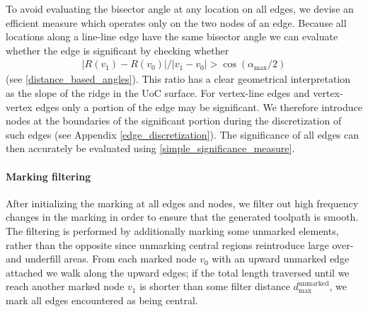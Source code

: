 To avoid evaluating the bisector angle at any location on all edges, we devise an efficient measure which operates only on the two nodes of an edge.
Because all locations along a line-line edge have the same bisector angle we can evaluate whether the edge is significant by checking whether 
\begin{align}\label{simple_significance_measure}
| R(v_1) - R(v_0) | / |v_1 - v_0| >  \cos(\alpha_\text{max} / 2)
\end{align}
(see \cref{distance_based_angles}).
This ratio has a clear geometrical interpretation as the slope of the ridge in the UoC surface.
For vertex-line edges and vertex-vertex edges only a portion of the edge may be significant.
We therefore introduce nodes at the boundaries of the significant portion during the discretization of such edges (see Appendix \ref{edge_discretization}).
The significance of all edges can then accurately be evaluated using \cref{simple_significance_measure}.






\paragraph{Marking filtering}
After initializing the marking at all edges and nodes, we filter out high frequency changes in the marking in order to ensure that the generated toolpath is smooth. 
The filtering is performed by additionally marking some unmarked elements, rather than the opposite since unmarking central regions reintroduce large over- and underfill areas.
From each marked node $v_0$ with an upward unmarked edge attached we walk along the upward edges;
if the total length traversed until we reach another marked node $v_1$ is shorter than some filter distance $d_\text{max}^\text{unmarked}$, we mark all edges encountered as being central.















